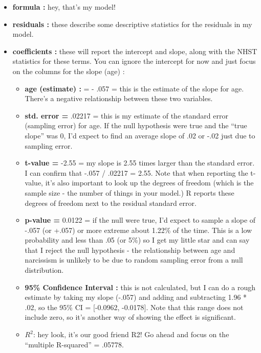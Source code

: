 \documentclass[
  letterpaper,
  DIV=11,
  numbers=noendperiod,
  oneside]{scrreprt}
\begin{document}
\begin{itemize}
\item
  \textbf{formula :} hey, that's my model!
\item
  \textbf{residuals :} these describe some descriptive statistics for
  the residuals in my model.
\item
  \textbf{coefficients :} these will report the intercept and slope,
  along with the NHST statistics for these terms. You can ignore the
  intercept for now and just focus on the columns for the slope (age) :~

  \begin{itemize}
  \item
    \textbf{age (estimate) :} = - .057 = this is the estimate of the
    slope for age. There's a negative relationship between these two
    variables.
  \item
    \textbf{std. error =} .02217 = this is my estimate of the standard
    error (sampling error) for age. If the null hypothesis were true and
    the ``true slope'' was 0, I'd expect to find an average slope of .02
    or -.02 just due to sampling error.
  \item
    \textbf{t-value =} -2.55 = my slope is 2.55 times larger than the
    standard error. I can confirm that -.057 / .02217 = 2.55. Note that
    when reporting the t-value, it's also important to look up the
    degrees of freedom (which is the sample size - the number of things
    in your model.) R reports these degrees of freedom next to the
    residual standard error.
  \item
    \textbf{p-value =} 0.0122 = if the null were true, I'd expect to
    sample a slope of -.057 (or +.057) or more extreme about 1.22\% of
    the time. This is a low probability and less than .05 (or 5\%) so I
    get my little star and can say that I reject the null hypothesis -
    the relationship between age and narcissism is unlikely to be due to
    random sampling error from a null distribution.
  \item
    \textbf{95\% Confidence Interval :} this is not calculated, but I
    can do a rough estimate by taking my slope (-.057) and adding and
    subtracting 1.96 * .02, so the 95\% CI = {[}-0.0962, -0.0178{]}.
    Note that this range does not include zero, so it's another way of
    showing the effect is significant.
  \item
    \(R^2\): hey look, it's our good friend R2! Go ahead and focus on
    the ``multiple R-squared'' = .05778.
  \end{itemize}
\end{itemize}
\end{document}

